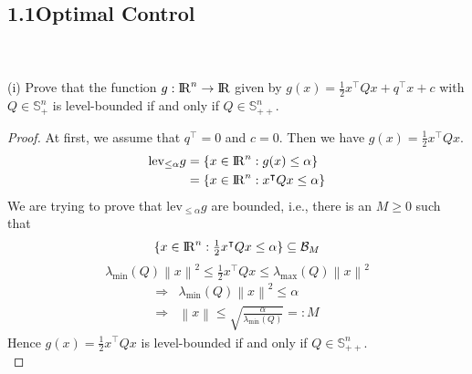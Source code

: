 \documentclass[a4paper,11pt,reqno]{amsart}
\newcommand{\R}{{\rm I\!R}}
\newcommand{\tran}{\intercal}
\begin{document}
\subsection*{1.1\quad Optimal Control}\label{sec:q1}
\
\\ \\
(i) Prove that the function $g:\R^n\to \R$ given by $g(x) = \frac{1}{2}x^{\tran}Qx+q^{\tran}x+c$ with $Q\in \mathbb{S}^n_+$ is level-bounded
if and only if $Q\in \mathbb{S}^n_{++}$.
\\ 
\begin{proof}
    At first, we assume that $q^{\tran}=0$ and $c=0$. Then we have $g(x)=\tfrac{1}{2}x^{\tran}Qx$.
\begin{align}
    \mathrm{lev}_{\leq \alpha}g&=\{x\in\R^n:g(x)\leq\alpha\}
    \\
    &=\{x\in\R^n:x^{\tran}Qx\leq\alpha\}
\end{align}
We are trying to prove that $\mathrm{lev}_{\leq \alpha}g$ are bounded, i.e., there is an $M\geq 0$ such that
\begin{equation}
    \{x\in\R^n:\tfrac{1}{2}x^{\tran}Qx\leq\alpha\}\subseteq \mathcal{B}_M
    \label{eq:lev_prove_1}
\end{equation}
\begin{equation}
    \lambda_{\mathrm{min}}(Q)\left\lVert x\right\rVert ^2\leq \tfrac{1}{2}x^{\tran}Qx\leq \lambda_{\mathrm{max}}(Q)\left\lVert x\right\rVert ^2
    \label{eq:lev_prove_2}
\end{equation}
\begin{align}
    \Longrightarrow &\lambda_{\mathrm{min}}(Q)\left\lVert x\right\rVert ^2\leq \alpha
    \label{eq:lev_prove_3}
    \\
    \Longrightarrow &\left\lVert x\right\rVert \leq \sqrt{\frac{\alpha}{\lambda_{\mathrm{min}}(Q)}}=:M
    \label{eq:lev_prove_4}
\end{align}
Hence $g(x)=\tfrac{1}{2}x^{\tran}Qx$ is level-bounded if and only if $Q\in \mathbb{S}^n_{++}$.
\\

\end{proof}
\end{document}
